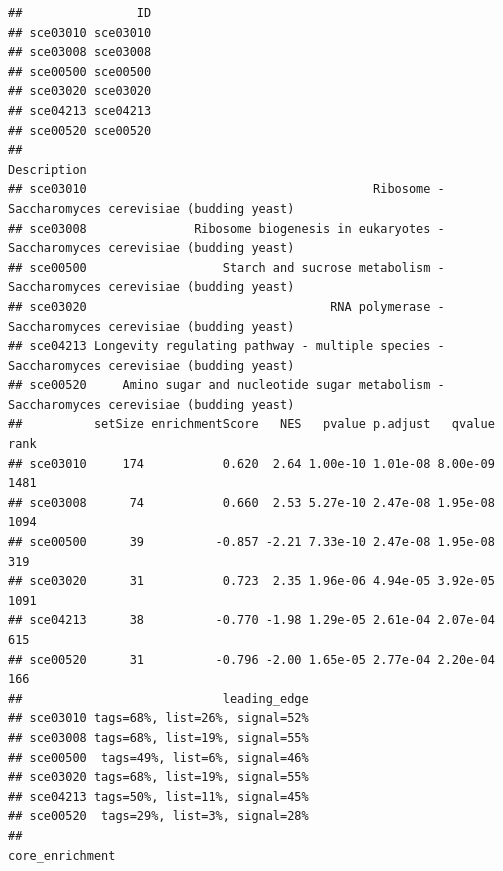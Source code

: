 \documentclass[
]{book}
\begin{document}
\begin{verbatim}
##                ID
## sce03010 sce03010
## sce03008 sce03008
## sce00500 sce00500
## sce03020 sce03020
## sce04213 sce04213
## sce00520 sce00520
##                                                                                         Description
## sce03010                                        Ribosome - Saccharomyces cerevisiae (budding yeast)
## sce03008               Ribosome biogenesis in eukaryotes - Saccharomyces cerevisiae (budding yeast)
## sce00500                   Starch and sucrose metabolism - Saccharomyces cerevisiae (budding yeast)
## sce03020                                  RNA polymerase - Saccharomyces cerevisiae (budding yeast)
## sce04213 Longevity regulating pathway - multiple species - Saccharomyces cerevisiae (budding yeast)
## sce00520     Amino sugar and nucleotide sugar metabolism - Saccharomyces cerevisiae (budding yeast)
##          setSize enrichmentScore   NES   pvalue p.adjust   qvalue rank
## sce03010     174           0.620  2.64 1.00e-10 1.01e-08 8.00e-09 1481
## sce03008      74           0.660  2.53 5.27e-10 2.47e-08 1.95e-08 1094
## sce00500      39          -0.857 -2.21 7.33e-10 2.47e-08 1.95e-08  319
## sce03020      31           0.723  2.35 1.96e-06 4.94e-05 3.92e-05 1091
## sce04213      38          -0.770 -1.98 1.29e-05 2.61e-04 2.07e-04  615
## sce00520      31          -0.796 -2.00 1.65e-05 2.77e-04 2.20e-04  166
##                            leading_edge
## sce03010 tags=68%, list=26%, signal=52%
## sce03008 tags=68%, list=19%, signal=55%
## sce00500  tags=49%, list=6%, signal=46%
## sce03020 tags=68%, list=19%, signal=55%
## sce04213 tags=50%, list=11%, signal=45%
## sce00520  tags=29%, list=3%, signal=28%
##                                                                                                                                                                                                                                                                                                                                                                                                                                                                                                                                                                                                                                                                                                                                                                                                                                                                                                                                                                                                  core_enrichment

\end{verbatim}
\end{document}
